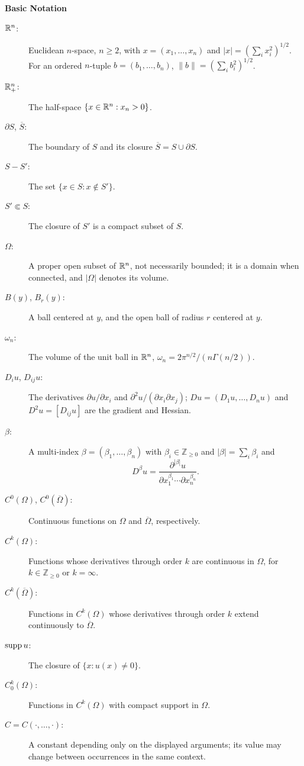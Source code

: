 \begin{notation}\label{gt.not.basic-notation}
\noindent\textbf{Basic Notation}

\begin{description}
\item[$\mathbb{R}^n$:] Euclidean $n$-space, $n\geq2$, with
$x=(x_1,\dots,x_n)$ and
$|x|=(\sum_i x_i^2)^{1/2}$. For an ordered $n$-tuple
$b=(b_1,\dots,b_n)$, $\|b\|=(\sum_i b_i^2)^{1/2}$.
\item[$\mathbb{R}^n_+$:] The half-space $\{x\in\mathbb{R}^n:x_n>0\}$.
\item[$\partial S$, $\overline S$:] The boundary of $S$ and its closure
$\overline S=S\cup\partial S$.
\item[$S-S'$:] The set $\{x\in S:x\notin S'\}$.
\item[$S'\Subset S$:] The closure of $S'$ is a compact subset of $S$.
\item[$\Omega$:] A proper open subset of $\mathbb{R}^n$, not necessarily bounded; it is
a domain when connected, and $|\Omega|$ denotes its volume.
\item[$B(y)$, $B_r(y)$:] A ball centered at $y$, and the open ball of radius
$r$ centered at $y$.
\item[$\omega_n$:] The volume of the unit ball in $\mathbb{R}^n$,
$\omega_n=2\pi^{n/2}/(n\Gamma(n/2))$.
\item[$D_i u$, $D_{ij}u$:] The derivatives
$\partial u/\partial x_i$ and
$\partial^2u/(\partial x_i\partial x_j)$; $Du=(D_1u,\dots,D_nu)$ and
$D^2u=[D_{ij}u]$ are the gradient and Hessian.
\item[$\beta$:] A multi-index
$\beta=(\beta_1,\dots,\beta_n)$ with $\beta_i\in\mathbb Z_{\geq0}$ and
$|\beta|=\sum_i\beta_i$ and
\[
D^\beta u=
\frac{\partial^{|\beta|}u}
{\partial x_1^{\beta_1}\cdots\partial x_n^{\beta_n}}.
\]
\item[$C^0(\Omega)$, $C^0(\overline\Omega)$:] Continuous functions on
$\Omega$ and $\overline\Omega$, respectively.
\item[$C^k(\Omega)$:] Functions whose derivatives through order $k$ are
continuous in $\Omega$, for $k\in\mathbb Z_{\geq0}$ or $k=\infty$.
\item[$C^k(\overline\Omega)$:] Functions in $C^k(\Omega)$ whose derivatives
through order $k$ extend continuously to $\overline\Omega$.
\item[$\operatorname{supp} u$:] The closure of $\{x:u(x)\neq0\}$.
\item[$C_0^k(\Omega)$:] Functions in $C^k(\Omega)$ with compact support in
$\Omega$.
\item[$C=C(\cdot,\dots,\cdot)$:] A constant depending only on the displayed
arguments; its value may change between occurrences in the same context.
\end{description}
\end{notation}
